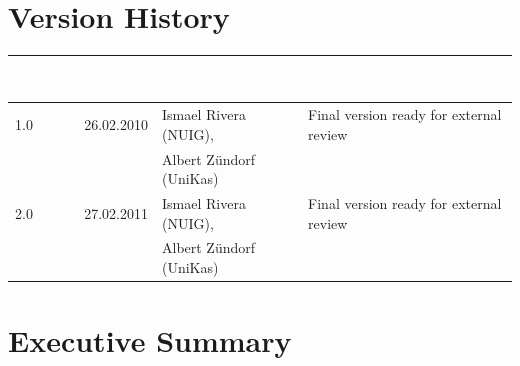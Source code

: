 \documentclass{fast_latex}
\begin{document}


\section*{Version History}

\begin{small}
\begin{tabular}{|l|l|l|p{7.5cm}|}
\hline
\rowcolor{fast@lightgrey}\textcolor{white}{\textbf{Rev. No.}} &
                            \textcolor{white}{\textbf{Date}} &
                            \textcolor{white}{\textbf{Author (Partner)}} &
							\textcolor{white}{\textbf{Change description}}\\ \hline
1.0 & 26.02.2010 & Ismael Rivera (NUIG), & Final version ready for external review \\ 
 & & Albert Zündorf (UniKas) & \\ \hline
2.0 & 27.02.2011 & Ismael Rivera (NUIG), & Final version ready for external review \\ 
 & & Albert Zündorf (UniKas) & \\ \hline
\end{tabular}
\end{small}

\color{black}

\vfill

\newpage


\clearpage

\section*{Executive Summary}
\doublespacing
\end{document}
